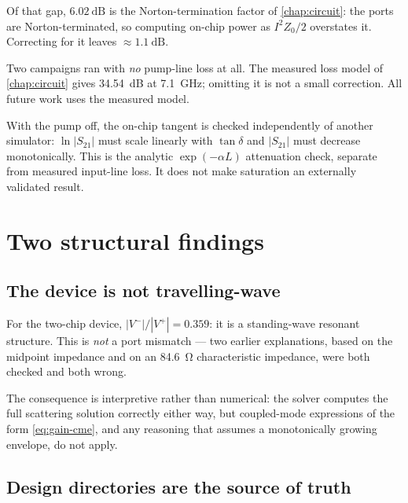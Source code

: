 Of that gap, $\SI{6.02}{\dB}$ is the Norton-termination factor of
\cref{chap:circuit}: the ports are Norton-terminated, so computing on-chip power
as $I^{2}Z_0/2$ overstates it. Correcting for it leaves $\approx\SI{1.1}{\dB}$.

\begin{caveat}
Two campaigns ran with \emph{no} pump-line loss at all. The measured loss model
of \cref{chap:circuit} gives \SI{34.54}{\dB} at \SI{7.1}{\giga\hertz}; omitting
it is not a small correction. All future work uses the measured model.
\end{caveat}

\begin{implnote}
With the pump off, the on-chip tangent is checked independently of another
simulator: $\ln|S_{21}|$ must scale linearly with $\tan\delta$ and
$|S_{21}|$ must decrease monotonically. This is the analytic
$\exp(-\alpha L)$ attenuation check, separate from measured input-line loss.
It does not make saturation an externally validated result.
\end{implnote}

\section{Two structural findings}

\subsection{The device is not travelling-wave}

\begin{measured}
For the two-chip device, $|V^-|/|V^+| = 0.359$: it is a standing-wave resonant
structure. This is \emph{not} a port mismatch --- two earlier explanations,
based on the midpoint impedance and on an \SI{84.6}{\ohm} characteristic
impedance, were both checked and both wrong.
\end{measured}

The consequence is interpretive rather than numerical: the solver computes the
full scattering solution correctly either way, but coupled-mode expressions of
the form \eqref{eq:gain-cme}, and any reasoning that assumes a monotonically
growing envelope, do not apply.

\subsection{Design directories are the source of truth}

